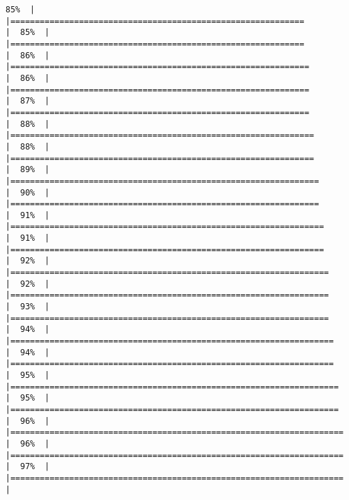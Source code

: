 \documentclass[
]{book}
\begin{document}
\begin{verbatim}
85%  |                                                                              |============================================================          |  85%  |                                                                              |============================================================          |  86%  |                                                                              |=============================================================         |  86%  |                                                                              |=============================================================         |  87%  |                                                                              |=============================================================         |  88%  |                                                                              |==============================================================        |  88%  |                                                                              |==============================================================        |  89%  |                                                                              |===============================================================       |  90%  |                                                                              |===============================================================       |  91%  |                                                                              |================================================================      |  91%  |                                                                              |================================================================      |  92%  |                                                                              |=================================================================     |  92%  |                                                                              |=================================================================     |  93%  |                                                                              |=================================================================     |  94%  |                                                                              |==================================================================    |  94%  |                                                                              |==================================================================    |  95%  |                                                                              |===================================================================   |  95%  |                                                                              |===================================================================   |  96%  |                                                                              |====================================================================  |  96%  |                                                                              |====================================================================  |  97%  |                                                                              |====================================================================  |  
\end{verbatim}
\end{document}
